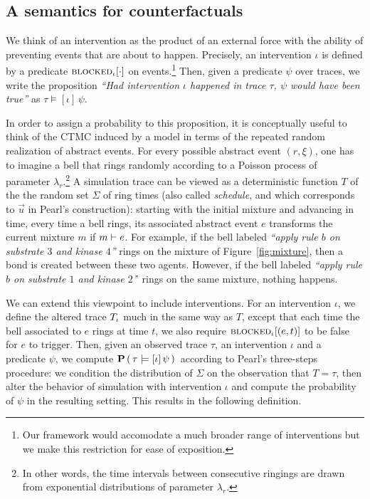\subsection{A semantics for counterfactuals}
\label{sec:counterfactuals-semantics}
We think of an intervention as the product of an external force with
the ability of preventing events that are about to happen. Precisely,
an intervention $\iota$ is defined by a predicate
${\textsc{blocked}}_{\iota}[\cdot]$ on events.\footnote{Our framework would
  accomodate a much broader range of interventions but we make this
  restriction for ease of exposition.}  Then, given a predicate $\psi$
over traces, we write the proposition \textit{``Had
  intervention $\iota$ happened in trace $\tau$, $\psi$ would have
  been true''} as $\tau \models [\iota] \, \psi.$


In order to assign a probability to this proposition, it is
conceptually useful to think of the CTMC induced by a model
in terms of the repeated random realization of abstract events.  For
every possible abstract event $(r, \xi)$, one has to imagine a bell
that rings randomly according to a Poisson process of parameter
$\lambda_r$.\footnote{In other words, the time intervals between
  consecutive ringings are drawn from exponential distributions of
  parameter $\lambda_r$.}  A simulation trace can be viewed as a
deterministic function $T$ of the
the random set $\Sigma$ of ring times (also called \emph{schedule},
and which corresponds to $\vec{u}$ in Pearl's construction): starting
with the initial mixture and advancing in time, every time a bell
rings, its associated abstract event $e$ transforms the current
mixture $m$ if $m \vdash e$. For example, if the bell labeled
\textit{``apply rule $b$ on substrate $3$ and kinase $4$''} rings on
the mixture of Figure~\ref{fig:mixture}, then a bond is created
between these two agents. However, if the bell labeled \textit{``apply
  rule $b$ on substrate $1$ and kinase $2$'}' rings on the same
mixture, nothing happens.

We can extend this viewpoint to include interventions. For an
intervention $\iota$, we define the altered trace ${T_\iota}{}$ much in
the same way as $T$, except that each time the bell associated to $e$
rings at time $t$, we also require ${\textsc{blocked}}_{\iota}[(e, t)]$ to be
false for $e$ to trigger. Then, given an observed trace $\tau$, an
intervention $\iota$ and a predicate $\psi$, we compute $\mathbf{P}\left( \,\tau \models [\iota] \, \psi \,\right){}$
according to Pearl's three-steps procedure: \ItAbduction{} we condition
the distribution of $\Sigma$ on the observation that $T=\tau$, then
\ItAction{} alter the behavior of simulation with intervention $\iota$
and \ItPrediction{} compute the probability of $\psi$ in the resulting
setting. This results in the following definition.

